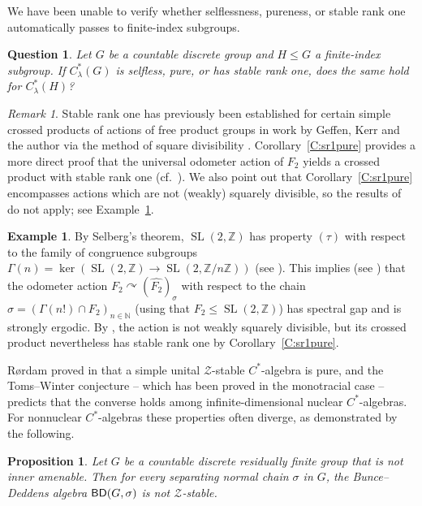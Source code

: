 \documentclass[11pt,a4,leqno]{amsart}
\newtheorem{prop}[thm]{Proposition}
\newtheorem{question}{Question}
\theoremstyle{definition}
\newtheorem{example}[thm]{Example}
\theoremstyle{remark}
\newtheorem{rem}[thm]{Remark}
\numberwithin{equation}{section}
\theoremstyle{plain}
\newcommand{\Nb}{\mathbb{N}}
\newcommand{\Zb}{\mathbb{Z}}
\newcommand{\BD}{{\sf{BD}}}
\begin{document}
We have been unable to verify whether selflessness, pureness, or stable rank one automatically passes to finite-index subgroups. 

\begin{question}
    Let $G$ be a countable discrete group and $H\le G$ a finite-index subgroup. If $C^*_\lambda(G)$ is selfless, pure, or has stable rank one, does the same hold for $C^*_\lambda(H)$? 
\end{question}

\begin{rem}
    Stable rank one has previously been established for certain simple crossed products of actions of free product groups in work by Geffen, Kerr and the author via the method of square divisibility \cite{BelGefKer25}. Corollary~\ref{C:sr1pure} provides a more direct proof that the universal odometer action of $F_2$ yields a crossed product with stable rank one (cf.~\cite[Remark 9.4]{BelGefKer25}). We also point out that Corollary~\ref{C:sr1pure} encompasses actions which are not (weakly) squarely divisible, so the results of \cite{BelGefKer25} do not apply; see Example~\ref{E:con_sub}.
\end{rem}

\begin{example}\label{E:con_sub}
    By Selberg's theorem, $\operatorname{SL}(2,\Zb)$ has property $(\tau)$ with respect to the family of congruence subgroups $\Gamma(n) = \ker(\operatorname{SL}(2,\Zb) \to \operatorname{SL}(2,\Zb/n\Zb))$ (see \cite{Sel65,LubZuk05}). This implies (see \cite[Theorem 6]{AbeEle12}) that the odometer action $F_2\curvearrowright (\widehat{F_2})_\sigma$ with respect to the chain $\sigma = (\Gamma(n!)\cap F_2)_{n\in\Nb}$ (using that $F_2\le \operatorname{SL}(2,\Zb)$) has spectral gap and is strongly ergodic. By \cite[Proposition 3.15]{BelGefKer25}, the action is not weakly squarely divisible, but its crossed product nevertheless has stable rank one by Corollary~\ref{C:sr1pure}.
\end{example}

R{\o}rdam proved in \cite{Ror04} that a simple unital $\mathcal{Z}$-stable $C^*$-algebra is pure, and the Toms--Winter conjecture -- which has been proved in the monotracial case -- predicts that the converse holds among infinite-dimensional nuclear $C^*$-algebras. For nonnuclear $C^*$-algebras these properties often diverge, as demonstrated by the following. 

\begin{prop}\label{P:Zstable}
    Let $G$ be a countable discrete residually finite group that is not inner amenable. Then for every separating normal chain $\sigma$ in $G$, the Bunce--Deddens algebra $\BD (G,\sigma)$ is not $\mathcal{Z}$-stable. 
\end{prop}
\end{document}

